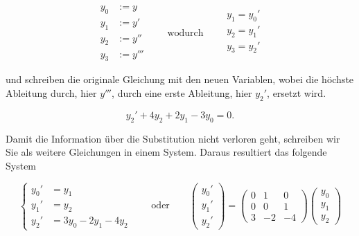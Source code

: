 \begin{equation*}
    \begin{aligned}
        y_0 &:= y \\
        y_1 &:= y' \\
        y_2 &:= y'' \\
        y_3 &:= y'''
    \end{aligned} \qquad \text{wodurch} \qquad
    \begin{aligned}
        y_1 = y_0' \\
        y_2 = y_1' \\
        y_3 = y_2' \\
    \end{aligned}
\end{equation*}

\vspace{0.25\baselineskip}

und schreiben die originale Gleichung mit den neuen Variablen, wobei die höchste Ableitung durch, hier \( y''' \), durch eine erste Ableitung, hier \( y_2' \), ersetzt wird. 

\begin{equation*}
    y_2' + 4y_2 + 2y_1 - 3y_0 = 0.
\end{equation*}

Damit die Information über die Substitution nicht verloren geht, schreiben wir Sie als weitere Gleichungen in einem System. Daraus resultiert das folgende System

\begin{equation*}
    \left\{ \begin{aligned}
        y_0' &= y_1 \\
        y_1' &= y_2 \\
        y_2' &= 3y_0 - 2y_1 -4y_2
    \end{aligned} \right. \qquad \text{oder} \qquad
    \begin{pmatrix}
        y_0' \\
        y_1' \\
        y_2'
    \end{pmatrix} =
    \begin{pmatrix}
        0 & 1 & 0 \\
        0 & 0 & 1 \\
        3 & -2 & -4
    \end{pmatrix}
    \begin{pmatrix}
        y_0 \\
        y_1 \\
        y_2
    \end{pmatrix} 
\end{equation*}

